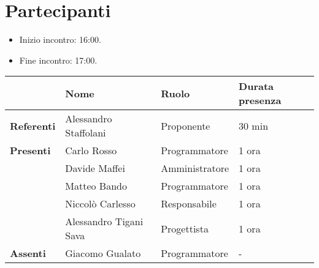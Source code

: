 \section*{Partecipanti}

\begin{itemize}
	\item Inizio incontro: 16:00.
	\item Fine incontro: 17:00.
\end{itemize}


\begin{center}
	{\renewcommand{\arraystretch}{1.5}
		\begin{tabular}{l|lll}
			                   	& \textbf{Nome}          & \textbf{Ruolo}  & \textbf{Durata presenza} \\
			\hline
			\textbf{Referenti} 	& Alessandro Staffolani  	& Proponente		& 30 min	\\
			\hline
			\textbf{Presenti} 	& Carlo Rosso            	& Programmatore    	& 1 ora	\\
								& Davide Maffei          	& Amministratore   	& 1 ora	\\
								& Matteo Bando           	& Programmatore		& 1 ora	\\
								& Niccolò Carlesso       	& Responsabile  	& 1 ora	\\
								& Alessandro Tigani Sava 	& Progettista 		& 1 ora	\\
			\hline
			\textbf{Assenti}	& Giacomo Gualato			& Programmatore		& - \\
		\end{tabular}
	}
\end{center}

